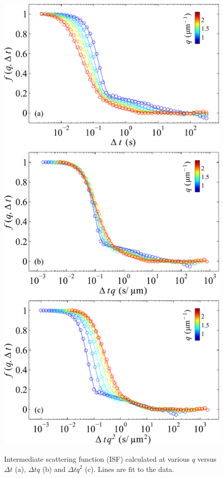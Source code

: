 \documentclass[%
 aip,
 jmp,%
 amsmath,amssymb,
reprint,%
]{revtex4-1}
\begin{document}
\begin{figure}
	\includegraphics[width=\linewidth]{ISF_Fonction_TetTq2etTq_Bact.pdf}\\
	\caption{Intermediate scattering function (ISF) calculated at various $q$ versus $\Delta t$ (a), $\Delta tq$ (b) and $\Delta tq^2$ (c). Lines are fit to the data.}
	\label{ISFBacteria}
\end{figure}
\end{document}
